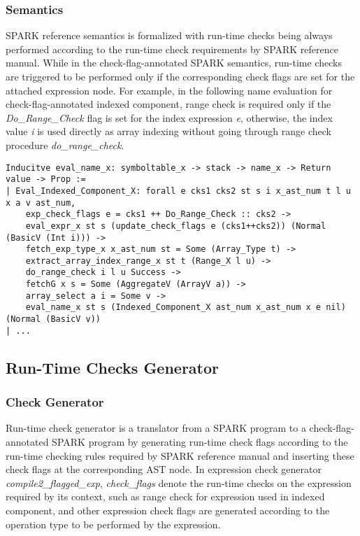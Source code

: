 \subsubsection{Semantics}
SPARK reference semantics is formalized with run-time checks being always
performed according to the run-time check requirements by SPARK reference
manual. While in the check-flag-annotated SPARK semantics, run-time checks are
triggered to be performed only if the corresponding check flags are set for the
attached expression node. For example, in the following name evaluation for
check-flag-annotated indexed component, range check is required only if the
\textit{Do\_Range\_Check} flag is set for the index expression \textit{e},
otherwise, the index value \textit{i} is used directly as array indexing without
going through range check procedure \textit{do\_range\_check}.

 \begin{lstlisting}[escapechar=\#, language=coq, basicstyle=\scriptsize]
Inducitve eval_name_x: symboltable_x -> stack -> name_x -> Return value -> Prop :=
| Eval_Indexed_Component_X: forall e cks1 cks2 st s i x_ast_num t l u x a v ast_num, 
    exp_check_flags e = cks1 ++ Do_Range_Check :: cks2 ->
    eval_expr_x st s (update_check_flags e (cks1++cks2)) (Normal (BasicV (Int i))) ->
    fetch_exp_type_x x_ast_num st = Some (Array_Type t) ->
    extract_array_index_range_x st t (Range_X l u) ->
    do_range_check i l u Success ->
    fetchG x s = Some (AggregateV (ArrayV a)) ->
    array_select a i = Some v ->
    eval_name_x st s (Indexed_Component_X ast_num x_ast_num x e nil) (Normal (BasicV v))
| ...
\end{lstlisting}

\subsection{Run-Time Checks Generator}
\subsubsection{Check Generator}
Run-time check generator is a translator from a SPARK program to a
check-flag-annotated SPARK program by generating run-time check flags according
to the run-time checking rules required by SPARK reference manual and inserting
these check flags at the corresponding AST node. In expression check generator
\textit{compile2\_flagged\_exp}, \textit{check\_flags} denote the run-time
checks on the expression required by its context, such as range check for
expression used in indexed component, and other expression check flags are
generated according to the operation type to be performed by the expression.

